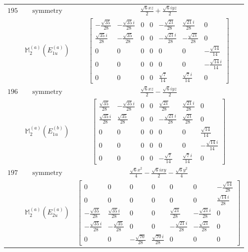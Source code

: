 \documentclass[fleqn,8pt,landscape]{jsarticle}
\begin{document}
\begin{longtable}{ccc}
$ 195 $ & $ \text{symmetry} $ & $ \frac{\sqrt{6} x z}{2} + \frac{\sqrt{6} i y z}{2} $ \\
$  $ & $ \mathbb{M}_{2}^{(a)}(E_{1u}^{(a)}) $ & $ \begin{bmatrix} - \frac{\sqrt{35}}{28} & - \frac{\sqrt{35} i}{28} & 0 & 0 & - \frac{\sqrt{21}}{28} & \frac{\sqrt{21} i}{28} & 0 \\ \frac{\sqrt{35} i}{28} & - \frac{\sqrt{35}}{28} & 0 & 0 & - \frac{\sqrt{21} i}{28} & - \frac{\sqrt{21}}{28} & 0 \\ 0 & 0 & 0 & 0 & 0 & 0 & - \frac{\sqrt{14}}{14} \\ 0 & 0 & 0 & 0 & 0 & 0 & - \frac{\sqrt{14} i}{14} \\ 0 & 0 & 0 & 0 & \frac{\sqrt{7}}{14} & \frac{\sqrt{7} i}{14} & 0 \end{bmatrix} $ \\ \hline
$ 196 $ & $ \text{symmetry} $ & $ \frac{\sqrt{6} x z}{2} - \frac{\sqrt{6} i y z}{2} $ \\
$  $ & $ \mathbb{M}_{2}^{(a)}(E_{1u}^{(b)}) $ & $ \begin{bmatrix} \frac{\sqrt{35}}{28} & - \frac{\sqrt{35} i}{28} & 0 & 0 & \frac{\sqrt{21}}{28} & \frac{\sqrt{21} i}{28} & 0 \\ \frac{\sqrt{35} i}{28} & \frac{\sqrt{35}}{28} & 0 & 0 & - \frac{\sqrt{21} i}{28} & \frac{\sqrt{21}}{28} & 0 \\ 0 & 0 & 0 & 0 & 0 & 0 & \frac{\sqrt{14}}{14} \\ 0 & 0 & 0 & 0 & 0 & 0 & - \frac{\sqrt{14} i}{14} \\ 0 & 0 & 0 & 0 & - \frac{\sqrt{7}}{14} & \frac{\sqrt{7} i}{14} & 0 \end{bmatrix} $ \\ \hline
$ 197 $ & $ \text{symmetry} $ & $ \frac{\sqrt{6} x^{2}}{4} - \frac{\sqrt{6} i x y}{2} - \frac{\sqrt{6} y^{2}}{4} $ \\
$  $ & $ \mathbb{M}_{2}^{(a)}(E_{2u}^{(a)}) $ & $ \begin{bmatrix} 0 & 0 & 0 & 0 & 0 & 0 & - \frac{\sqrt{14}}{28} \\ 0 & 0 & 0 & 0 & 0 & 0 & \frac{\sqrt{14} i}{28} \\ - \frac{\sqrt{35}}{28} & \frac{\sqrt{35} i}{28} & 0 & 0 & \frac{\sqrt{21}}{28} & - \frac{\sqrt{21} i}{28} & 0 \\ - \frac{\sqrt{35} i}{28} & - \frac{\sqrt{35}}{28} & 0 & 0 & - \frac{\sqrt{21} i}{28} & - \frac{\sqrt{21}}{28} & 0 \\ 0 & 0 & - \frac{\sqrt{70}}{28} & \frac{\sqrt{70} i}{28} & 0 & 0 & 0 \end{bmatrix} $ \\ \hline

\end{longtable}
\end{document}
